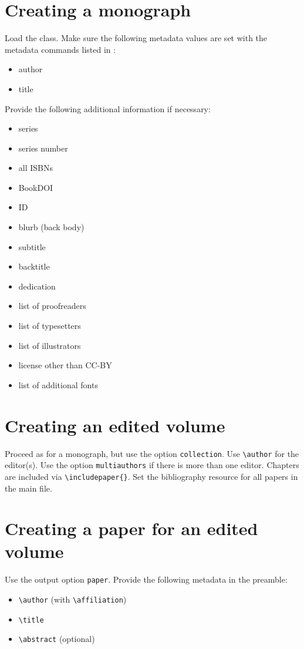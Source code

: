 \documentclass[output=guidelines]{langscibook}
\begin{document}
\section{Creating a monograph}
Load the class. Make sure the following metadata values are set with the metadata commands listed in :

\begin{itemize}
 \item author
 \item title
\end{itemize}

Provide the following additional information if necessary:
\begin{itemize}
 \item series
 \item series number
 \item all ISBNs
 \item BookDOI
 \item ID
 \item blurb (back body)
 \item subtitle
 \item backtitle
 \item dedication
 \item list of proofreaders
 \item list of typesetters
 \item list of illustrators
 \item license other than CC-BY
 \item list of additional fonts
\end{itemize}


\section{Creating an edited volume}
Proceed as for a monograph, but use the option \texttt{collection}. Use \verb+\author+ for the editor(s). Use the option \texttt{multiauthors} if there is more than one editor.
Chapters are included via \verb+\includepaper{}+. Set the bibliography resource for all papers in the main file.


\section{Creating a paper for an edited volume}
Use the output option \texttt{paper}. Provide the following metadata in the preamble:
\begin{itemize}
 \item \verb+\author+ (with \verb+\affiliation+)
 \item \verb+\title+
 \item \verb+\abstract+ (optional)
\end{itemize}
\end{document}
